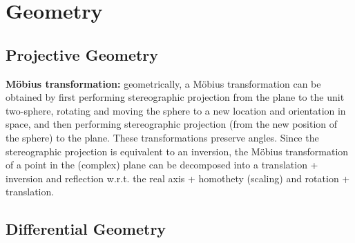 \section{Geometry}

\subsection{Projective Geometry}

\begin{list}{}{}
	\item \textbf{Möbius transformation:} geometrically, a Möbius transformation can be obtained by first performing stereographic projection from the plane to the unit two-sphere, rotating and moving the sphere to a new location and orientation in space, and then performing stereographic projection (from the new position of the sphere) to the plane. These transformations preserve angles. Since the stereographic projection is equivalent to an inversion, the Möbius transformation of a point in the (complex) plane can be decomposed into a translation + inversion and reflection w.r.t. the real axis + homothety (scaling) and rotation + translation.
\end{list}


\subsection{Differential Geometry}

